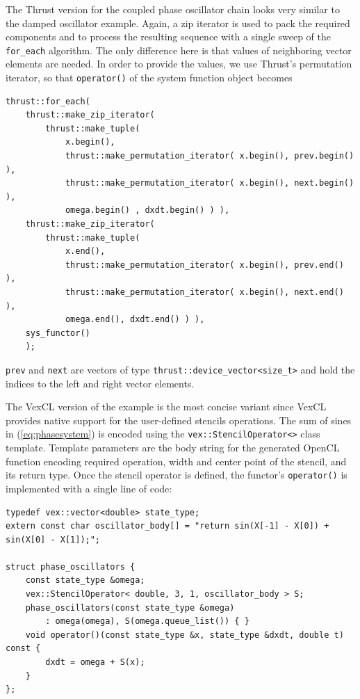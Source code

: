 \documentclass[final]{siamltex}
\newcommand{\code}[1]{\lstinline|#1|}
\newcommand{\eqref}[1]{(\ref{#1})}
\begin{document}
The Thrust version for the coupled phase oscillator chain looks very similar to
the damped oscillator example. Again, a zip iterator is used to pack the required
components and to process the resulting sequence with a single sweep of the
\code{for_each} algorithm. The only difference here is that values of
neighboring vector elements are needed. In order to provide the values, we use Thrust's
permutation iterator, so that \code{operator()} of the system function object becomes
\begin{lstlisting}
thrust::for_each(
    thrust::make_zip_iterator(
        thrust::make_tuple(
            x.begin(),
            thrust::make_permutation_iterator( x.begin(), prev.begin() ),
            thrust::make_permutation_iterator( x.begin(), next.begin() ),
            omega.begin() , dxdt.begin() ) ),
    thrust::make_zip_iterator(
        thrust::make_tuple(
            x.end(),
            thrust::make_permutation_iterator( x.begin(), prev.end() ),
            thrust::make_permutation_iterator( x.begin(), next.end() ),
            omega.end(), dxdt.end() ) ),
    sys_functor()
    );
\end{lstlisting}
\code{prev} and \code{next} are vectors of type
\code{thrust::device_vector<size_t>} and hold the indices to the left and right vector
elements.

The VexCL version of the example is the most
concise variant since VexCL provides native support for the user-defined
stencils operations. The sum of sines in \eqref{eq:phasesystem} is encoded
using the \code{vex::StencilOperator<>} class template. Template parameters
are the body string for the generated OpenCL function encoding required
operation, width and center point of the stencil, and its return type. Once the
stencil operator is defined, the functor's \code{operator()} is implemented
with a single line of code:
\begin{lstlisting}
typedef vex::vector<double> state_type;
extern const char oscillator_body[] = "return sin(X[-1] - X[0]) + sin(X[0] - X[1]);";

struct phase_oscillators {
    const state_type &omega;
    vex::StencilOperator< double, 3, 1, oscillator_body > S;
    phase_oscillators(const state_type &omega)
        : omega(omega), S(omega.queue_list()) { }
    void operator()(const state_type &x, state_type &dxdt, double t) const {
        dxdt = omega + S(x);
    }
};
\end{lstlisting}
\end{document}
